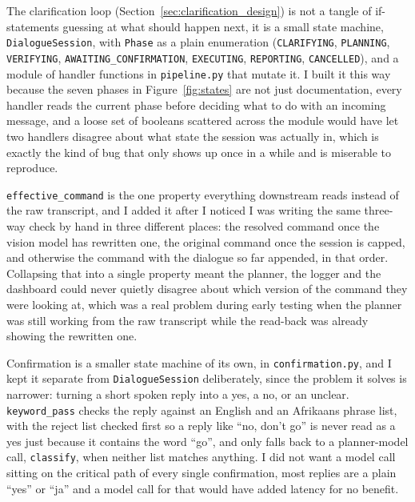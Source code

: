 \label{sec:orchestration}

\label{sec:clarification_impl}

The clarification loop (Section~\ref{sec:clarification_design}) is not a
tangle of if-statements guessing at what should happen next, it is a small
state machine, \texttt{DialogueSession}, with \texttt{Phase} as a plain
enumeration (\texttt{CLARIFYING}, \texttt{PLANNING}, \texttt{VERIFYING},
\texttt{AWAITING\_CONFIRMATION}, \texttt{EXECUTING}, \texttt{REPORTING},
\texttt{CANCELLED}), and a module of handler functions in
\texttt{pipeline.py} that mutate it. I built it this way because the seven
phases in Figure~\ref{fig:states} are not just documentation, every handler
reads the current phase before deciding what to do with an incoming
message, and a loose set of booleans scattered across the module would have
let two handlers disagree about what state the session was actually in,
which is exactly the kind of bug that only shows up once in a while and is
miserable to reproduce.

\texttt{effective\_command} is the one property everything downstream reads
instead of the raw transcript, and I added it after I noticed I was writing
the same three-way check by hand in three different places: the resolved
command once the vision model has rewritten one, the original command once
the session is capped, and otherwise the command with the dialogue so far
appended, in that order. Collapsing that into a single property meant the
planner, the logger and the dashboard could never quietly disagree about
which version of the command they were looking at, which was a real
problem during early testing when the planner was still working from the
raw transcript while the read-back was already showing the rewritten one.

Confirmation is a smaller state machine of its own, in
\texttt{confirmation.py}, and I kept it separate from
\texttt{DialogueSession} deliberately, since the problem it solves is
narrower: turning a short spoken reply into a yes, a no, or an unclear.
\texttt{keyword\_pass} checks the reply against an English and an Afrikaans
phrase list, with the reject list checked first so a reply like ``no,
don't go'' is never read as a yes just because it contains the word
``go'', and only falls back to a planner-model call, \texttt{classify},
when neither list matches anything. I did not want a model call sitting on
the critical path of every single confirmation, most replies are a plain
``yes'' or ``ja'' and a model call for that would have added latency for no
benefit.

